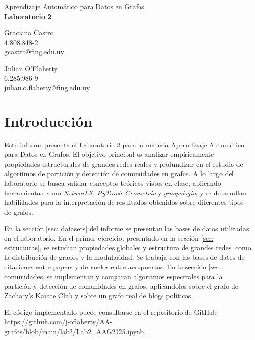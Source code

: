 \documentclass{article}
\begin{document}
\begin{center}
    {\Large Aprendizaje Automático para Datos en Grafos} \\
    {\LARGE \textbf{Laboratorio 2}} \\
    \vspace{2em}
    \begin{minipage}{0.45\textwidth}
        \centering
        Graciana Castro \\
        4.808.848-2 \\
        gcastro@fing.edu.uy
    \end{minipage}
    \hfill
    \begin{minipage}{0.45\textwidth}
        \centering
        Julian O'Flaherty \\
        6.285.986-9 \\
        julian.o.flaherty@fing.edu.uy
    \end{minipage}
\end{center}


\section{Introducción}



Este informe presenta el Laboratorio 2 para la materia Aprendizaje Automático para Datos en Grafos. El objetivo principal es analizar empíricamente propiedades estructurales de grandes redes reales y profundizar en el estudio de algoritmos de partición y detección de comunidades en grafos. A lo largo del laboratorio se busca validar conceptos teóricos vistos en clase, aplicando herramientas como \textit{NetworkX}, \textit{PyTorch Geometric} y \textit{graspologic}, y se desarrollan habilidades para la interpretación de resultados obtenidos sobre diferentes tipos de grafos.

En la sección \ref{sec: datasets} del informe se presentan las bases de datos utilizadas en el laboratorio. En el primer ejercicio, presentado en la sección \ref{sec: estructuras}, se estudian propiedades globales y estructura de grandes redes, como la distribución de grados y la modularidad. Se trabaja con las bases de datos de citaciones entre papers y de vuelos entre aeropuertos. En la sección \ref{sec: comunidades} se implementan y comparan algoritmos espectrales para la partición y detección de comunidades en grafos, aplicándolos sobre el grafo de Zachary's Karate Club y sobre un grafo real de blogs políticos.

El código implementado puede consultarse en el repositorio de GitHub \url{https://github.com/j-oflaherty/AA-grafos/blob/main/lab2/Lab2_AAG2025.ipynb}.
\end{document}
